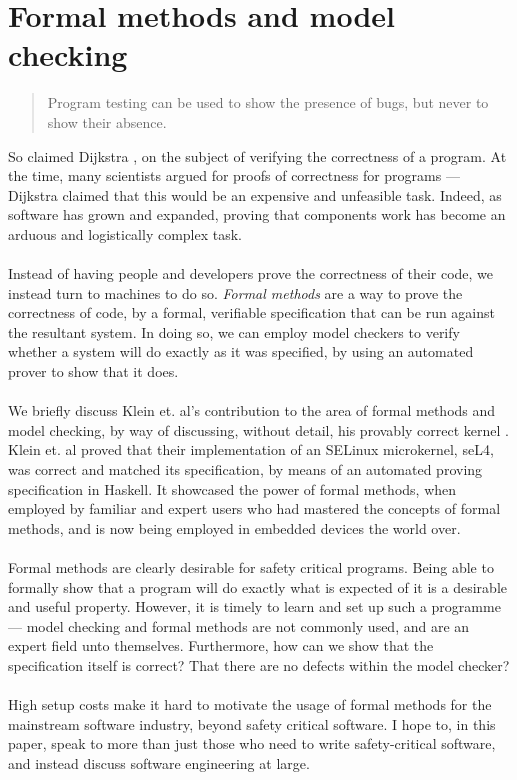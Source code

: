 \section{Formal methods and model checking} \label{sec:otherdets:modelCheck}

\begin{quote}
Program testing can be used to show the presence of bugs, but never to show their absence.
\end{quote}

So claimed Dijkstra \cite{dijkstra1970notes}, on the subject of verifying the correctness of a program.
At the time, many scientists argued for proofs of correctness for programs --- Dijkstra claimed that
this would be an expensive and unfeasible task.
Indeed, as software has grown and expanded, proving that components work has become an arduous and
logistically complex task.\\
\\
Instead of having people and developers prove the correctness of their code, we instead turn to
machines to do so.
{\em Formal methods} are a way to prove the correctness of code, by a formal, verifiable
specification that can be run against the resultant system.
In doing so, we can employ model checkers to verify whether a system will do exactly as it was
specified, by using an automated prover to show that it does.\\
\\
We briefly discuss Klein et. al's contribution to the area of formal methods and model checking, by way of
discussing, without detail, his provably correct kernel \cite{klein2009sel4}.
Klein et. al proved that their implementation of an SELinux microkernel, seL4, was correct and
matched its specification, by means of an automated proving specification in Haskell.
It showcased the power of formal methods, when employed by familiar and expert users who had
mastered the concepts of formal methods, and is now being employed in embedded devices the world
over.\\
\\
Formal methods are clearly desirable for safety critical programs.
Being able to formally show that a program will do exactly what is expected of it is a desirable and
useful property.
However, it is timely to learn and set up such a programme --- model checking and formal methods are
not commonly used, and are an expert field unto themselves.
Furthermore, how can we show that the specification itself is correct?
That there are no defects within the model checker?\\
\\
High setup costs make it hard to motivate the usage of formal methods for the mainstream software
industry, beyond safety critical software.
I hope to, in this paper, speak to more than just those who need to write safety-critical software,
and instead discuss software engineering at large.

